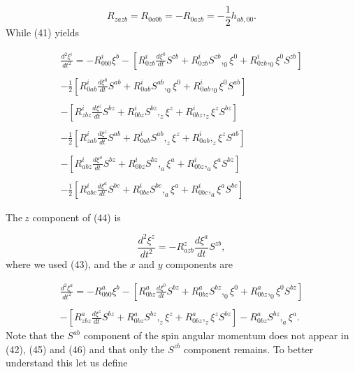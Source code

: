 \documentclass[a4paper,12pt]{article}
\begin{document}
\begin{equation}
R_{zazb}=R_{0a0b}=-R_{0azb}=-\frac{1}{2}h_{ab,00}.  \label{43}
\end{equation}
While (41) yields

\begin{equation}
\begin{array}{c}
\frac{d^{2}\xi ^{i}}{dt^{2}}=-R_{0b0}^{i}\xi ^{b}-[R_{0zb}^{i}\frac{d\xi ^{0}%
}{dt}S^{zb}+R_{0zb}^{i}S^{zb},_{0}\xi ^{0}+R_{0zb}^{i},_{0}\xi ^{0}S^{zb}]
\\ 
\\ 
-\frac{1}{2}[R_{0ab}^{i}\frac{d\xi ^{0}}{dt}S^{ab}+R_{0ab}^{i}S^{ab},_{0}\xi
^{0}+R_{0ab}^{i},_{0}\xi ^{0}S^{ab}] \\ 
\\ 
-[R_{zbz}^{i}\frac{d\xi ^{z}}{dt}S^{bz}+R_{0bz}^{i}S^{bz},_{z}\xi
^{z}+R_{0bz}^{i},_{z}\xi ^{z}S^{bz}] \\ 
\\ 
-\frac{1}{2}[R_{zab}^{i}\frac{d\xi ^{z}}{dt}S^{ab}+R_{0ab}^{i}S^{ab},_{z}\xi
^{z}+R_{0ab}^{i},_{z}\xi ^{z}S^{ab}] \\ 
\\ 
-[R_{abz}^{i}\frac{d\xi ^{a}}{dt}S^{bz}+R_{0bz}^{i}S^{bz},_{a}\xi
^{a}+R_{0bz}^{i},_{a}\xi ^{a}S^{bz}] \\ 
\\ 
-\frac{1}{2}[R_{abc}^{i}\frac{d\xi ^{a}}{dt}S^{bc}+R_{0bc}^{i}S^{bc},_{a}\xi
^{a}+R_{0bc}^{i},_{a}\xi ^{a}S^{bc}]
\end{array}
\label{44}
\end{equation}

The$\ z$ component of (44) is

\begin{equation}
\frac{d^{2}\xi ^{z}}{dt^{2}}=-R_{azb}^{z}\frac{d\xi ^{a}}{dt}S^{zb},
\label{45}
\end{equation}
where we used (43), and the $x$ and $y$ components are

\begin{equation}
\begin{array}{c}
\frac{d^{2}\xi ^{a}}{dt^{2}}=-R_{0b0}^{a}\xi ^{b}-[R_{0bz}^{a}\frac{d\xi ^{0}%
}{dt}S^{bz}+R_{0bz}^{a}S^{bz},_{0}\xi ^{0}+R_{0bz}^{a},_{0}\xi ^{0}S^{bz}]
\\ 
\\ 
-[R_{zbz}^{a}\frac{d\xi ^{z}}{dt}S^{bz}+R_{0bz}^{a}S^{bz},_{z}\xi
^{z}+R_{0bz}^{a},_{z}\xi ^{z}S^{bz}]-R_{0bz}^{a}S^{bz},_{a}\xi ^{a}.
\end{array}
\label{46}
\end{equation}
Note that the $S^{ab}$ component of the spin angular momentum does not
appear in (42), (45) and (46) and that only the $S^{zb}$ component remains$.$
To better understand this let us define
\end{document}

